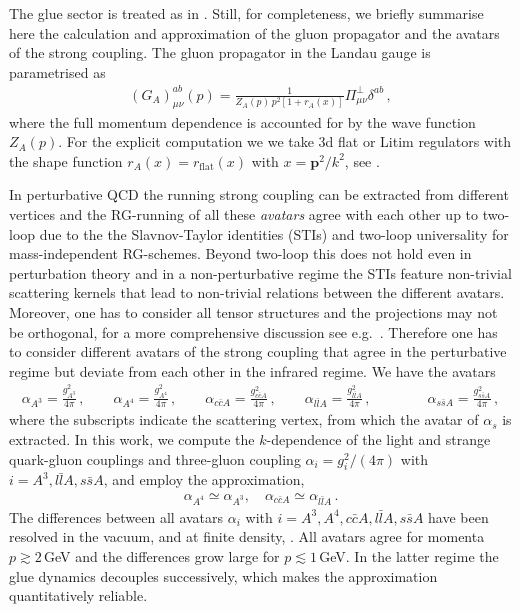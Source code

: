 \documentclass[reprint,twocolumn,superscriptaddress,preprintnumbers,amsmath,amssymb,aps,prd,floatfix]{revtex4-2}
\begin{document}
The glue sector is treated as in \cite{Fu:2019hdw, Ihssen:2024miv, Fu:2024rto}. Still, for completeness, we briefly summarise here the calculation and approximation of the gluon propagator and the avatars of the strong coupling. The gluon propagator in the Landau gauge is parametrised as 
%
\begin{align}
	(G_A)^{ab}_{\mu\nu}(p) =\frac{1}{Z_A(p)\,p^2 \left[  1 +r_A(x) \right]}\Pi_{\mu \nu}^{\perp}\delta^{ab}\,,	
	\label{eq:GA} 
\end{align}
% 
where the full momentum dependence is accounted for by the wave function $Z_A(p)$. For the explicit computation we we take 3d flat or Litim regulators with the shape function $r_A(x)= r_\textrm{flat}(x)$ with $x= \boldsymbol{p}^2/k^2$, see . 

In perturbative QCD the running strong coupling can be extracted from different vertices and the RG-running of all these \textit{avatars} agree with each other up to two-loop due to the the Slavnov-Taylor identities (STIs) and two-loop universality for mass-independent RG-schemes. Beyond two-loop this does not hold even in perturbation theory and in a non-perturbative regime the STIs feature non-trivial scattering kernels that lead to non-trivial relations between the different avatars. Moreover, one has to consider all  tensor structures and the projections may not be orthogonal, for a more comprehensive discussion see e.g.~\cite{Dupuis:2020fhh, Pawlowski:2022oyq, Ihssen:2024miv}. Therefore one has to consider different avatars of the strong coupling that agree in the perturbative regime but deviate from each other in the infrared regime. We have the avatars 
%
\begin{align} 
	\alpha_{A^3}= \frac{g^2_{A^3}}{4 \pi}\,,\qquad \alpha_{A^4}= \frac{g^2_{A^4}}{4 \pi}\,,\qquad \alpha_{c\bar c A}= \frac{g^2_{c\bar c A}}{4 \pi}\,,\qquad \alpha_{l\bar l A}= \frac{g^2_{l \bar l A}}{4 \pi}\,,\qquad \qquad \alpha_{s\bar s A}= \frac{g^2_{s \bar s A}}{4 \pi}\,,  
\label{eq:AllAvatarsalpha}
\end{align}
%
where the subscripts indicate the scattering vertex, from which the avatar of $\alpha_s$ is extracted. In this work, we compute the $k$-dependence of the light and strange quark-gluon couplings and three-gluon coupling $\alpha_i=g_i^2 /(4 \pi)$ with $i=A^3, l\bar lA, s\bar s A$, and employ the approximation, 
%
\begin{align}
	\alpha_{A^4} \simeq  \alpha_{A^3}, \quad \alpha_{c \bar c A } \simeq \alpha_{l\bar l A}\,.
	\label{eq:alphaID}
\end{align}
% 
The differences between all avatars $\alpha_i$ with $i=A^3,A^4,c\bar c A, l\bar lA, s\bar s A$ have been resolved in the vacuum, \cite{Mitter:2014wpa, Cyrol:2017ewj, Ihssen:2024miv, Fu:2025hcm} and at finite density, \cite{Pawlowski:2025jpg}. All avatars agree for momenta $p\gtrsim 2$\,GeV and the differences grow large for $p\lesssim 1$\,GeV. In the latter regime the glue dynamics decouples successively, which makes the approximation  quantitatively reliable. 
\end{document}
